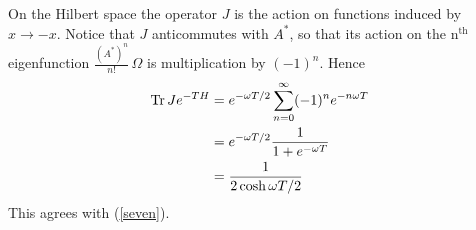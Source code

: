 \documentclass[12pt,leqno]{article}
\theoremstyle{plain}
{\theorembodyfont{}\newtheorem{thm}{Theorem}}
\theoremstyle{remark}
{\theorembodyfont{\rmfamily} \newtheorem*{Rem}{\bf Remark}}
\newcommand{\Tr}{\text{\rm Tr}}
\begin{document}
On the Hilbert space the operator $J$ is the action on
functions induced by $x\to-x$.
Notice that $J$ anticommutes with $A^*$, so that its
action on the n$^{\text{th}}$ eigenfunction
$\frac{(A^*)^n}{n!}\,\Omega$ is multiplication by $(-1)^n$.
Hence
\begin{align*}
\Tr\,Je^{-TH} &=e^{-\omega T/2}\sum\limits_{n=0}^\infty
  (-1)^n e^{-n\omega T}\\
&=e^{-\omega T/2}\frac{1}{1+e^{-\omega T}}\\
&=\frac{1}{2\cosh\omega T/2}
\end{align*}
This agrees with (\ref{seven}).
\end{document}

